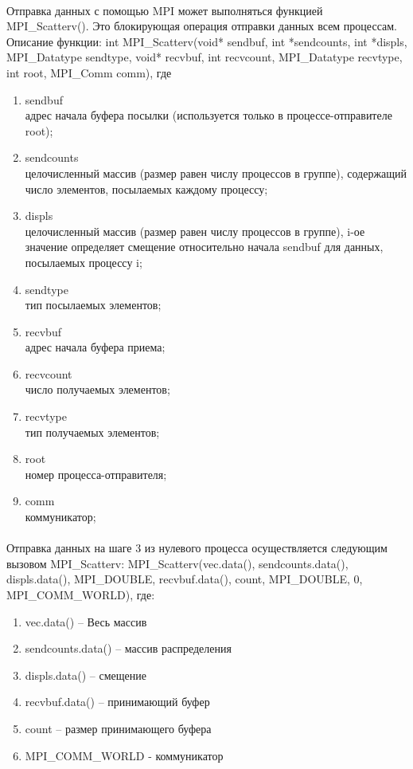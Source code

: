 \documentclass[12pt,a4paper]{article}
\begin{document}
\paragraph{}Отправка данных с помощью MPI может выполняться функцией MPI\_Scatterv(). Это блокирующая операция отправки данных всем процессам. Описание функции: int MPI\_Scatterv(void* sendbuf, int *sendcounts, int *displs, MPI\_Datatype sendtype, void* recvbuf, int recvcount, MPI\_Datatype recvtype, int root, MPI\_Comm comm), где
\begin{enumerate} 
\item sendbuf\\
адрес начала буфера посылки (используется только в процессе-отправителе root);
\item sendcounts\\
целочисленный массив (размер равен числу процессов в группе), содержащий число элементов, посылаемых каждому процессу;
\item displs\\
целочисленный массив (размер равен числу процессов в группе), i-ое значение определяет смещение относительно начала sendbuf для данных, посылаемых процессу i;
\item sendtype\\
тип посылаемых элементов;
\item recvbuf\\
адрес начала буфера приема;
\item recvcount\\
число получаемых элементов;
\item recvtype\\
тип получаемых элементов;
\item root\\
номер процесса-отправителя;
\item comm\\
коммуникатор;
\end{enumerate} 
\paragraph{}Отправка данных на шаге 3 из нулевого процесса осуществляется следующим вызовом MPI\_Scatterv: MPI\_Scatterv(vec.data(), sendcounts.data(), displs.data(), MPI\_DOUBLE, recvbuf.data(), count, MPI\_DOUBLE, 0, MPI\_COMM\_WORLD), где:
\begin{enumerate} 
\item vec.data() – Весь массив
\item sendcounts.data() – массив распределения
\item displs.data() – смещение
\item recvbuf.data() – принимающий буфер
\item count – размер принимающего буфера
\item MPI\_COMM\_WORLD - коммуникатор
\end{enumerate} 
\end{document}
